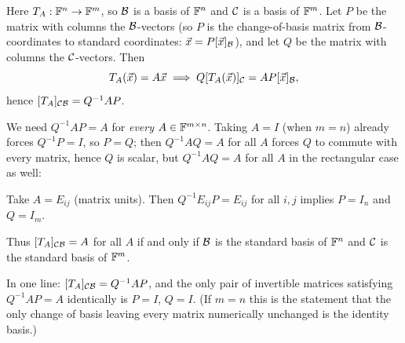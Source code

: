 \begin{coursebox}
Here $T_A:\mathbb{F}^n\to\mathbb{F}^m$, so $\mathcal{B}$ is a basis of $\mathbb{F}^n$ and $\mathcal{C}$ is a basis of
$\mathbb{F}^m$. Let $P$ be the matrix with columns the $\mathcal{B}$-vectors (so $P$ is the
change-of-basis matrix from $\mathcal{B}$-coordinates to standard coordinates:
$\vec{x}=P[\vec{x}]_{\mathcal{B}}$), and let $Q$ be the matrix with columns the
$\mathcal{C}$-vectors. Then
\[
T_A(\vec{x})=A\vec{x}
\implies
Q[T_A(\vec{x})]_{\mathcal{C}}=A P[\vec{x}]_{\mathcal{B}},
\]
hence $[T_A]_{\mathcal{C}\mathcal{B}}=Q^{-1}AP$.

We need $Q^{-1}AP=A$ for \emph{every} $A\in\mathbb{F}^{m\times n}$. Taking $A=I$ (when
$m=n$) already forces $Q^{-1}P=I$, so $P=Q$; then $Q^{-1}AQ=A$ for all $A$
forces $Q$ to commute with every matrix, hence $Q$ is scalar, but
$Q^{-1}AQ=A$ for all $A$ in the rectangular case as well:

Take $A=E_{ij}$ (matrix units). Then $Q^{-1}E_{ij}P=E_{ij}$ for all $i,j$
implies $P=I_n$ and $Q=I_m$.

Thus $[T_A]_{\mathcal{C}\mathcal{B}}=A$ for all $A$ if and only if $\mathcal{B}$ is the standard basis
of $\mathbb{F}^n$ and $\mathcal{C}$ is the standard basis of $\mathbb{F}^m$.
\end{coursebox}

\begin{laterbox}
In one line: $[T_A]_{\mathcal{C}\mathcal{B}}=Q^{-1}AP$, and the only pair of invertible
matrices satisfying $Q^{-1}AP=A$ identically is $P=I$, $Q=I$. (If $m=n$ this
is the statement that the only change of basis leaving every matrix numerically
unchanged is the identity basis.)
\end{laterbox}
